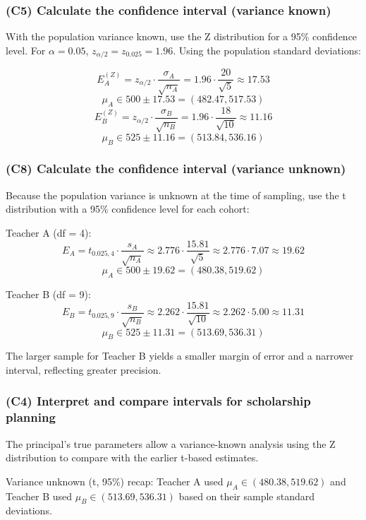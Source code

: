 \subsubsection{(C5) Calculate the confidence interval (variance known)}\label{subsubsec:interval-example1-1-c5}

With the population variance known, use the Z distribution for a 95\% confidence level. For \(\alpha = 0.05\), \(z_{\alpha/2} = z_{0.025} = 1.96\). Using the population standard deviations:

\[
E_A^{(Z)} = z_{\alpha/2} \cdot \frac{\sigma_A}{\sqrt{n_A}}
= 1.96 \cdot \frac{20}{\sqrt{5}}
\approx 17.53
\]
\[
\mu_A \in 500 \pm 17.53 = (482.47, 517.53)
\]
\[
E_B^{(Z)} = z_{\alpha/2} \cdot \frac{\sigma_B}{\sqrt{n_B}}
= 1.96 \cdot \frac{18}{\sqrt{10}}
\approx 11.16
\]
\[
\mu_B \in 525 \pm 11.16 = (513.84, 536.16)
\]

\subsubsection{(C8) Calculate the confidence interval (variance unknown)}\label{subsubsec:interval-example1-1-c8}

Because the population variance is unknown at the time of sampling, use the t distribution with a 95\% confidence level for each cohort:

Teacher A (df = 4):
\[
E_A = t_{0.025,4} \cdot \frac{s_A}{\sqrt{n_A}}
\approx 2.776 \cdot \frac{15.81}{\sqrt{5}}
\approx 2.776 \cdot 7.07 \approx 19.62
\]
\[
\mu_A \in 500 \pm 19.62 = (480.38, 519.62)
\]

Teacher B (df = 9):
\[
E_B = t_{0.025,9} \cdot \frac{s_B}{\sqrt{n_B}}
\approx 2.262 \cdot \frac{15.81}{\sqrt{10}}
\approx 2.262 \cdot 5.00 \approx 11.31
\]
\[
\mu_B \in 525 \pm 11.31 = (513.69, 536.31)
\]

The larger sample for Teacher B yields a smaller margin of error and a narrower interval, reflecting greater precision.

\subsubsection{(C4) Interpret and compare intervals for scholarship planning}\label{subsubsec:interval-example1-1-c4}

The principal's true parameters allow a variance-known analysis using the Z distribution to compare with the earlier t-based estimates.

Variance unknown (t, 95\%) recap: Teacher A used \(\mu_A \in (480.38, 519.62)\) and Teacher B used \(\mu_B \in (513.69, 536.31)\) based on their sample standard deviations.

